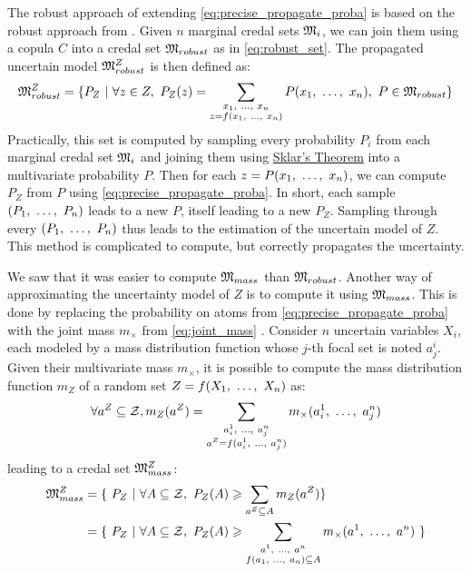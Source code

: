 The robust approach of extending \cref{eq:precise_propagate_proba} is based on the robust approach from . Given $n$ marginal credal sets $\mathfrak{M}_i$, we can join them using a copula $C$ into a credal set $\mathfrak{M}_{robust}$ as in \eqref{eq:robust_set}. The propagated uncertain model $\mathfrak{M}^Z_{robust}$ is then defined as:
\begin{align}
    \mathfrak{M}^Z_{robust} = \{P_Z~|~\forall z\in Z, ~P_Z(z)=\sum_{\substack{x_1 , ~\dots, ~ x_n\\z=f(x_1 , ~\dots, ~ x_n)}}P(x_1 , ~\dots, ~ x_n), ~P\in\mathfrak{M}_{robust}\}
\end{align}
Practically, this set is computed by sampling every probability $P_i$ from each marginal credal set $\mathfrak{M}_i$ and joining them using \hyperref[theorem:sklar]{Sklar's Theorem} into a multivariate probability $P$. Then for each $z=P(x_1 , ~\dots, ~ x_n)$, we can compute $P_Z$ from $P$ using \eqref{eq:precise_propagate_proba}. In short, each sample $(P_1 , ~\dots, ~ P_n)$ leads to a new $P$, itself leading to a new $P_Z$. Sampling through every $(P_1 , ~\dots, ~ P_n)$ thus leads to the estimation of the uncertain model of $Z$. This method is complicated to compute, but correctly propagates the uncertainty.

We saw that it was easier to compute $\mathfrak{M}_{mass}$ than $\mathfrak{M}_{robust}$. Another way of approximating the uncertainty model of $Z$ is to compute it using $\mathfrak{M}_{mass}$. This is done by replacing the probability on atoms from \cref{eq:precise_propagate_proba} with the joint mass $m_\times$ from \cref{eq:joint_mass} \cite{gray_dependent_2021}. Consider $n$ uncertain variables $X_i$, each modeled by a mass distribution function whose $j$-th focal set is noted $a^i_j$. Given their multivariate mass $m_\times$, it is possible to compute the mass distribution function $m_Z$ of a random set $Z=f(X_1 , ~\dots, ~ X_n)$ as:
\begin{align}
    \forall a^Z\subseteq\mathcal{Z}, m_Z(a^Z) = \sum_{\substack{a^1_i , ~\dots, ~ a^n_j\\a^Z=f(a^1_i , ~\dots, ~  a^n_j)}}m_\times(a^1_i , ~\dots, ~ a^n_j)\label{eq:mass_propagated}
\end{align}
leading to a credal set $\mathfrak{M}_{mass}^Z$:
\begin{align}
    \mathfrak{M}_{mass}^Z &= \{~P_Z~|~\forall A\subseteq\mathcal{Z},~P_Z(A)\geqslant \sum_{a^Z\subseteq A}m_Z(a^Z)\}\\
    &=\{~P_Z~|~\forall A\subseteq\mathcal{Z},~P_Z(A)\geqslant \sum_{\substack{a^1, ~\dots, ~ a^n \\ f(a_1, ~\dots, ~ a_n)\subseteq A}}m_\times(a^1, ~\dots, ~ a^n)~\}
\end{align}

